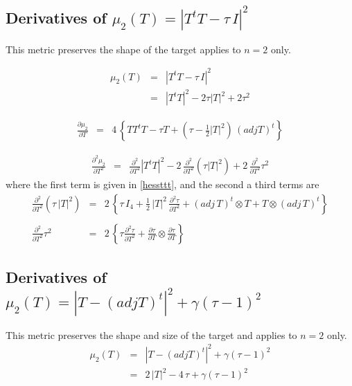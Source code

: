 \documentclass{report}
\begin{document}
\subsection{Derivatives of $\mu_2(T)=|T^t T - \tau \, I|^2$ \label{shape2d}}

This metric preserves the shape of the target applies to $n=2$ only. \newline

\begin{eqnarray}
\mu_2 (T) & = & |T^t T - \tau \, I|^2 \\
          & = & |T^t T|^2 - 2 \tau |T|^2 + 2 \tau^2 \nonumber
\end{eqnarray}

\begin{eqnarray}
\frac{\partial \mu_2}{\partial T} & = & 4 \, \left\{ T T^t T - \tau T + \left( \tau - \frac{1}{2} |T|^2 \right) \, (adj T)^t \right\}
\end{eqnarray}

\begin{eqnarray}
\frac{\partial^2 \mu_2}{\partial T^2} & = & \frac{\partial^2}{\partial T^2} |T^t T|^2 - 2 \, \frac{\partial^2}{\partial T^2} \left( \tau |T|^2 \right) + 2 \, \frac{\partial^2}{\partial T^2} \tau^2
\end{eqnarray}
where the first term is given in \ref{hessttt}, and the second a third terms are
\begin{eqnarray}
\frac{\partial^2}{\partial T^2} \left( \tau \, |T|^2 \right) & = & 2 \, \left\{ \tau \, I_4 + \frac{1}{2} \, |T|^2 \, \frac{\partial^2 \tau}{\partial T^2} + (adj \, T)^t \otimes T + T \otimes (adj \, T)^t \right\} \nonumber \\
 \\
\frac{\partial^2}{\partial T^2} \tau^2 & = & 2 \, \left\{ \tau \frac{\partial^2 \tau}{\partial T^2} + \frac{\partial \tau}{\partial T} \otimes \frac{\partial \tau}{\partial T} \right\}
\end{eqnarray}

\subsection{Derivatives of $\mu_2(T)=|T-(adj T)^t|^2 + \gamma (\tau-1)^2$ \label{ss2d} }

This metric preserves the shape and size of the target and applies to $n=2$ only.
\begin{eqnarray}
\mu_2 (T) & = & |T-(adj T)^t|^2 + \gamma (\tau-1)^2 \\
          & = & 2 \, |T|^2 - 4 \, \tau  + \gamma (\tau-1)^2
\end{eqnarray}
\end{document}
